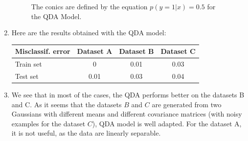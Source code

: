 \documentclass[a4paper, 11pt]{article}
\begin{document}
\begin{enumerate}[label=\alph*]
\begin{figure}[!htb]
          \label{fig:qda_c}
        \endminipage
        \caption{The conics are defined by the equation $p(y=1|x)=0.5$ for the QDA Model.}
        \label{fig:qda-plot}
        \end{figure}
        
    \item Here are the results obtained with the QDA model: \\
    
    \begin{tabular}{ | l | *{3}{| c} | }
         \hline
            Misclassif. error & Dataset A & Dataset B & Dataset C \\
         \hline
           Train set & 0    & 0.01 & 0.03 \\
           Test set  & 0.01 & 0.03 & 0.04 \\
         \hline
     \end{tabular}
     
     \item We see that in most of the cases, the QDA performs better on the datasets B and C. As it seems that the datasets $B$ and $C$ are generated from two Gaussians with different means and different covariance matrices (with noisy examples for the dataset $C$), QDA model is well adapted. For the dataset A, it is not useful, as the data are linearly separable.
\end{enumerate}
\end{document}

